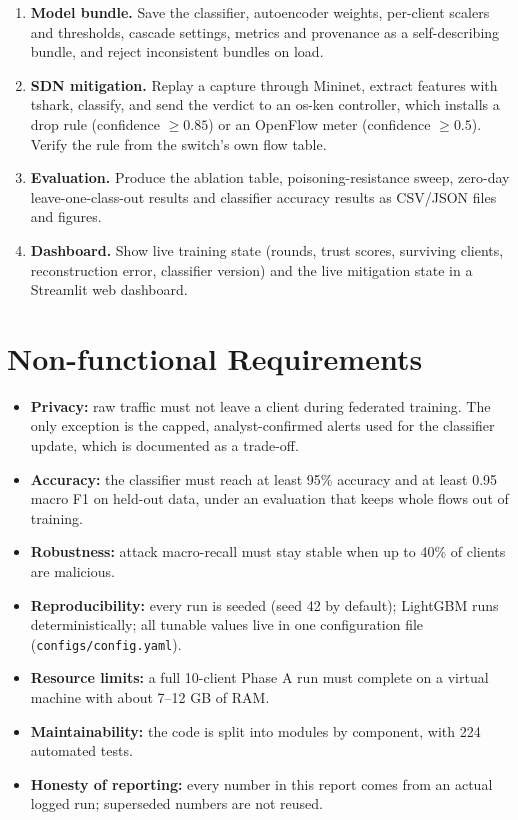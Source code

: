 \begin{enumerate}
  \item[FR8] \textbf{Model bundle.} Save the classifier, autoencoder weights, per-client scalers and thresholds, cascade settings, metrics and provenance as a self-describing bundle, and reject inconsistent bundles on load.
  \item[FR9] \textbf{SDN mitigation.} Replay a capture through Mininet, extract features with tshark, classify, and send the verdict to an os-ken controller, which installs a drop rule (confidence $\geq0.85$) or an OpenFlow meter (confidence $\geq0.5$). Verify the rule from the switch's own flow table.
  \item[FR10] \textbf{Evaluation.} Produce the ablation table, poisoning-resistance sweep, zero-day leave-one-class-out results and classifier accuracy results as CSV/JSON files and figures.
  \item[FR11] \textbf{Dashboard.} Show live training state (rounds, trust scores, surviving clients, reconstruction error, classifier version) and the live mitigation state in a Streamlit web dashboard.
\end{enumerate}

\section{Non-functional Requirements}
\begin{itemize}
  \item \textbf{Privacy:} raw traffic must not leave a client during federated training. The only exception is the capped, analyst-confirmed alerts used for the classifier update, which is documented as a trade-off.
  \item \textbf{Accuracy:} the classifier must reach at least 95\% accuracy and at least 0.95 macro F1 on held-out data, under an evaluation that keeps whole flows out of training.
  \item \textbf{Robustness:} attack macro-recall must stay stable when up to 40\% of clients are malicious.
  \item \textbf{Reproducibility:} every run is seeded (seed 42 by default); LightGBM runs deterministically; all tunable values live in one configuration file (\texttt{configs/config.yaml}).
  \item \textbf{Resource limits:} a full 10-client Phase A run must complete on a virtual machine with about 7--12 GB of RAM.
  \item \textbf{Maintainability:} the code is split into modules by component, with 224 automated tests.
  \item \textbf{Honesty of reporting:} every number in this report comes from an actual logged run; superseded numbers are not reused.
\end{itemize}


